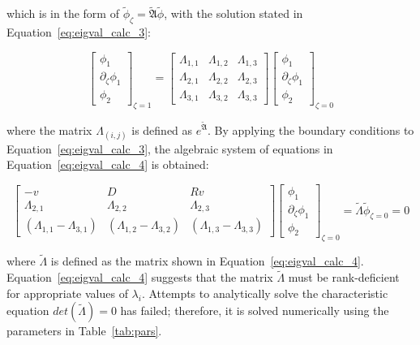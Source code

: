 which is in the form of $ \tilde{\phi}_\zeta  = \tilde{\mathfrak{A}} \tilde{\phi}$, with the solution stated in Equation~\ref{eq:eigval_calc_3}:

\begin{equation} \label{eq:eigval_calc_3}
    \begin{bmatrix}
        \phi_1 \\ \partial_\zeta \phi_1 \\ \phi_2
    \end{bmatrix}_{\zeta=1} = \begin{bmatrix}
        \Lambda_{1,1} & \Lambda_{1,2} & \Lambda_{1,3} \\
        \Lambda_{2,1} & \Lambda_{2,2} & \Lambda_{2,3} \\
        \Lambda_{3,1} & \Lambda_{3,2} & \Lambda_{3,3}
    \end{bmatrix} \begin{bmatrix}
        \phi_1 \\ \partial_\zeta \phi_1 \\ \phi_2
    \end{bmatrix}_{\zeta=0}
\end{equation}

where the matrix $\Lambda_{(i,j)}$ is defined as $e^{\tilde{\mathfrak{A}}}$. By applying the boundary conditions to Equation~\ref{eq:eigval_calc_3}, the algebraic system of equations in Equation~\ref{eq:eigval_calc_4} is obtained:

\begin{equation} \label{eq:eigval_calc_4}
    \begin{bmatrix}
        -v & D & Rv \\
        \Lambda_{2,1} & \Lambda_{2,2} & \Lambda_{2,3} \\
        (\Lambda_{1,1} - \Lambda_{3,1}) & (\Lambda_{1,2} - \Lambda_{3,2}) & (\Lambda_{1,3} - \Lambda_{3,3})
    \end{bmatrix} \begin{bmatrix}
        \phi_1 \\ \partial_\zeta \phi_1 \\ \phi_2
    \end{bmatrix}_{\zeta=0} = \tilde{\Lambda} \tilde{\phi}_{\zeta = 0} = 0
\end{equation}

where $\tilde{\Lambda}$ is defined as the matrix shown in Equation~\ref{eq:eigval_calc_4}. Equation~\ref{eq:eigval_calc_4} suggests that the matrix $\tilde{\Lambda}$ must be rank-deficient for appropriate values of $\lambda_i$. Attempts to analytically solve the characteristic equation $det(\tilde{\Lambda}) = 0$ has failed; therefore, it is solved numerically using the parameters in Table~\ref{tab:pars}. 

